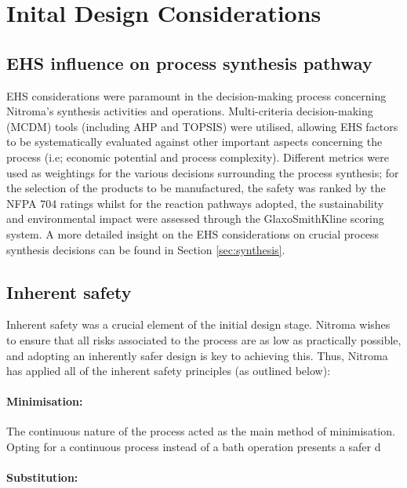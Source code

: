  
\section{Inital Design Considerations}

\subsection{EHS influence on process synthesis pathway}

EHS considerations were paramount in the decision-making process concerning Nitroma’s synthesis activities and operations. Multi-criteria decision-making (MCDM) tools (including AHP and TOPSIS) were utilised, allowing EHS factors to be systematically evaluated against other important aspects concerning the process (i.e; economic potential and process complexity). Different metrics were used as weightings for the various decisions surrounding the process synthesis; for the selection of the products to be manufactured, the safety was ranked by the NFPA 704 ratings whilst for the reaction pathways adopted, the sustainability and environmental impact were assessed through the GlaxoSmithKline scoring system. A more detailed insight on the EHS considerations on crucial process synthesis decisions can be found in Section \ref{sec:synthesis}. 

\subsection{Inherent safety}

Inherent safety was a crucial element of the initial design stage. Nitroma wishes to ensure that all risks associated to the process are as low as practically possible, and adopting an inherently safer design is key to achieving this. Thus, Nitroma has applied all of the inherent safety principles (as outlined below): 

\paragraph{Minimisation:} The continuous nature of the process acted as the main method of minimisation. Opting for a continuous process instead of a bath operation presents a safer d



\paragraph{Substitution:}



